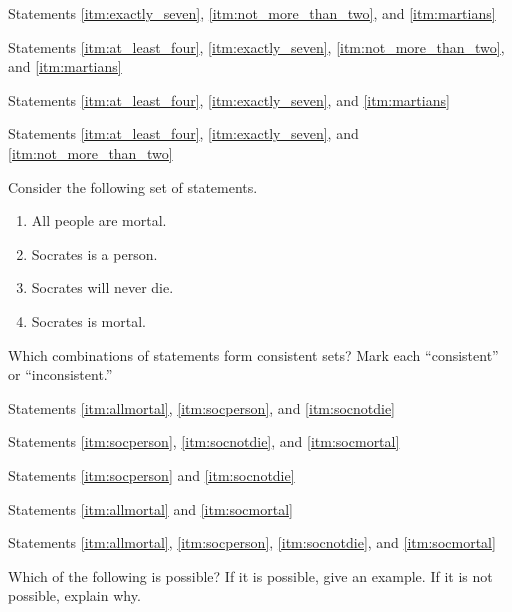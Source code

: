 \begin{exercises}
\item Statements \ref{itm:exactly_seven}, \ref{itm:not_more_than_two}, and \ref{itm:martians} 
\item Statements \ref{itm:at_least_four}, \ref{itm:exactly_seven}, \ref{itm:not_more_than_two}, and \ref{itm:martians} 
\item Statements \ref{itm:at_least_four}, \ref{itm:exactly_seven}, and \ref{itm:martians}
\item Statements \ref{itm:at_least_four}, \ref{itm:exactly_seven}, and \ref{itm:not_more_than_two} 
\end{exercises}

\noindent \problempart Consider the following set of statements.
\begin{enumerate}[label=(\alph*)]
\item \label{itm:allmortal} All people are mortal.
\item \label{itm:socperson} Socrates is a person.
\item \label{itm:socnotdie} Socrates will never die.
\item \label{itm:socmortal} Socrates is mortal.
\end{enumerate}
Which combinations of statements form consistent sets? Mark each “consistent” or “inconsistent.”
\begin{exercises}
\item Statements \ref{itm:allmortal}, \ref{itm:socperson}, and \ref{itm:socnotdie}  
\item Statements \ref{itm:socperson}, \ref{itm:socnotdie}, and \ref{itm:socmortal} 
\item Statements \ref{itm:socperson} and \ref{itm:socnotdie} 
\item Statements \ref{itm:allmortal} and \ref{itm:socmortal} 
\item Statements \ref{itm:allmortal}, \ref{itm:socperson}, \ref{itm:socnotdie}, and \ref{itm:socmortal}  
\end{exercises}

\noindent \problempart \label{pr.EnglishCombinations} Which of the following is possible? If it is possible, give an example. If it is not possible, explain why.


